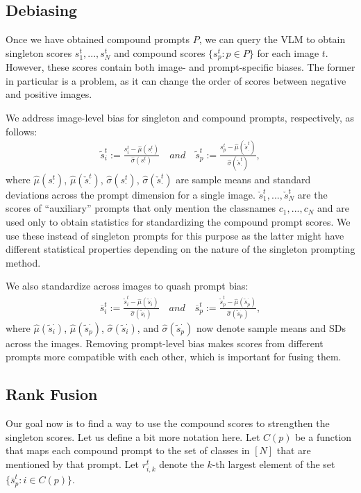 \subsection{Debiasing}
Once we have obtained compound prompts $P$, we can query the VLM to obtain singleton scores $s_1^t,...,s_N^t$ and compound scores $\{s_p^t : p \in P\}$ for each image $t$. However, these scores contain both image- and prompt-specific biases. The former in particular is a problem, as it can change the order of scores between negative and positive images.

We address image-level bias for singleton and compound prompts, respectively, as follows:
\begin{align}\label{eqn:debias_images}
\tilde{s}_i^t := \frac{s_i^t - \hat{\mu}(s_{\cdot}^t)}{\hat{\sigma}(s_{\cdot}^t)} \quad \textit{and} \quad
\tilde{s}_p^t := \frac{s_p^t - \hat{\mu}(\check{s}_{\cdot}^t)}{\hat{\sigma}(\check{s}_{\cdot}^t)},
\end{align}
where $\hat{\mu}(s_{\cdot}^t)$, $\hat{\mu}(\check{s}_{\cdot}^t)$, $\hat{\sigma}(s_{\cdot}^t)$, $\hat{\sigma}(\check{s}_{\cdot}^t)$ are sample means and standard deviations across the prompt dimension for a single image. $\check{s}_1^t,...,\check{s}_N^t$ are the scores of ``auxiliary'' prompts that only mention the classnames $c_1,...,c_N$ and are used only to obtain statistics for standardizing the compound prompt scores. We use these instead of singleton prompts for this purpose as the latter might have different statistical properties depending on the nature of the singleton prompting method.

We also standardize across images to quash prompt bias:
\begin{align}\label{eqn:debias_classes}
\overline{s}_i^t := \frac{\tilde{s}_i^t - \hat{\mu}(\tilde{s}_i^{\cdot})}{\hat{\sigma}(\tilde{s}_i^{\cdot})} \quad \textit{and} \quad
\overline{s}_p^t := \frac{\tilde{s}_p^t - \hat{\mu}(\tilde{s}_p^{\cdot})}{\hat{\sigma}(\tilde{s}_p^{\cdot})},
\end{align}
where $\hat{\mu}(\tilde{s}_i^{\cdot})$, $\hat{\mu}(\tilde{s}_p^{\cdot})$, $\hat{\sigma}(\tilde{s}_i^{\cdot})$, and $\hat{\sigma}(\tilde{s}_p^{\cdot})$ now denote sample means and SDs across the images. Removing prompt-level bias makes scores from different prompts more compatible with each other, which is important for fusing them.

\subsection{Rank Fusion}
Our goal now is to find a way to use the compound scores to strengthen the singleton scores. Let us define a bit more notation here. Let $C(p)$ be a function that maps each compound prompt to the set of classes in $[N]$ that are mentioned by that prompt. Let $r_{i,k}^t$ denote the $k$-th largest element of the set $\{\overline{s}_p^t : i \in C(p)\}$.

